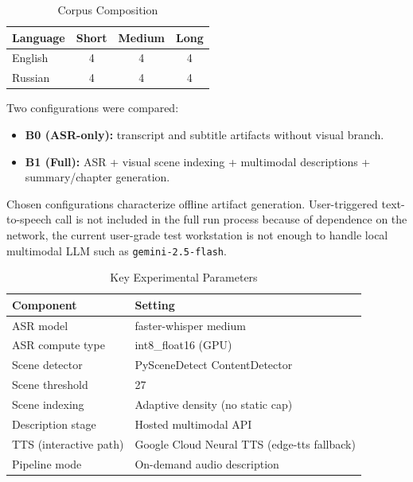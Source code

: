 ﻿\documentclass[conference]{IEEEtran}
\begin{document}
\begin{table}[t]
\caption{Corpus Composition}
\label{tab:corpus_comp}
\centering
\footnotesize
\setlength{\tabcolsep}{5pt}
\begin{tabular}{lccc}
\toprule
\textbf{Language} & \textbf{Short} & \textbf{Medium} & \textbf{Long} \\
\midrule
English & 4 & 4 & 4 \\
Russian & 4 & 4 & 4 \\
\bottomrule
\end{tabular}
\end{table}

Two configurations were compared:
\begin{itemize}
\item \textbf{B0 (ASR-only):} transcript and subtitle artifacts without visual branch.
\item \textbf{B1 (Full):} ASR + visual scene indexing + multimodal descriptions + summary/chapter generation.
\end{itemize}
Chosen configurations characterize offline artifact generation. User-triggered text-to-speech call is not included in the full run process because of dependence on the network, the current user-grade test workstation is not enough to handle local multimodal LLM such as \texttt{gemini-2.5-flash}.

\begin{table}[t]
\caption{Key Experimental Parameters}
\label{tab:exp_params}
\centering
\footnotesize
\setlength{\tabcolsep}{4.5pt}
\begin{tabular}{ll}
\toprule
\textbf{Component} & \textbf{Setting} \\
\midrule
ASR model & faster-whisper medium \\
ASR compute type & int8\_float16 (GPU) \\
Scene detector & PySceneDetect ContentDetector \\
Scene threshold & 27 \\
Scene indexing & Adaptive density (no static cap) \\
Description stage & Hosted multimodal API \\
TTS (interactive path) & Google Cloud Neural TTS (edge-tts fallback) \\
Pipeline mode & On-demand audio description \\
\bottomrule
\end{tabular}
\end{table}
\end{document}
